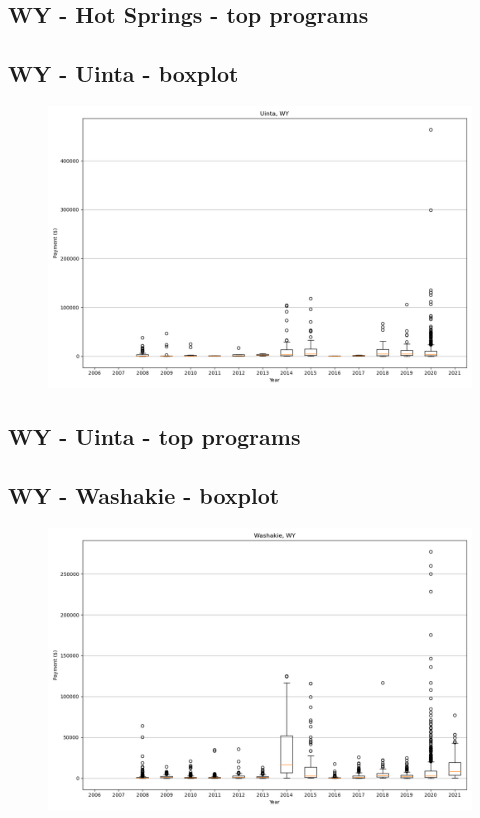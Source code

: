 \subsection*{WY - Hot Springs - top programs}

\newpage
\subsection*{WY - Uinta - boxplot}
\begin{figure}[h]
\centering
\includegraphics[width=7in]{../output/boxplots/counties/Uinta-WY_boxplot.png}
\end{figure}


\subsection*{WY - Uinta - top programs}

\newpage
\subsection*{WY - Washakie - boxplot}
\begin{figure}[h]
\centering
\includegraphics[width=7in]{../output/boxplots/counties/Washakie-WY_boxplot.png}
\end{figure}


